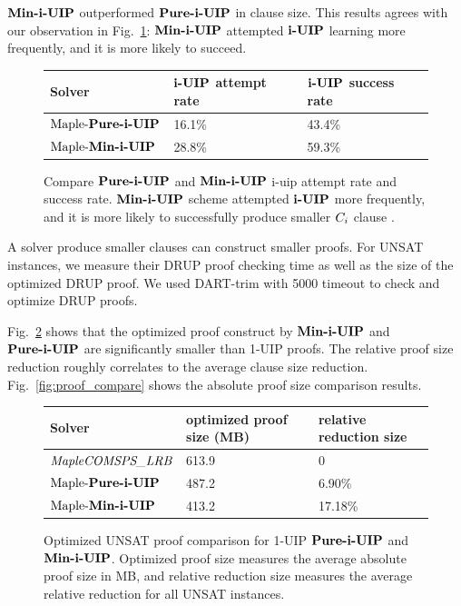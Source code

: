 $\textbf{Min-i-UIP}$ outperformed $\textbf{Pure-i-UIP}$ in clause size.  This results agrees with our observation in Fig.~\ref{fig:t2}: $\textbf{Min-i-UIP}$ attempted $\textbf{i-UIP}$ learning more frequently, and it is more likely to succeed.  

\begin{figure} 
\begin{center} 
\begin{tabular}{ | m{3.5cm} | m{5cm}| m{3.5cm} | } 
\hline
Solver & $\textbf{i-UIP}$ attempt rate & $\textbf{i-UIP}$ success rate  \\ 
\hline
$\text{Maple-\textbf{Pure-i-UIP}}$ & 16.1\% & 43.4\% \\ 
\hline
$\text{Maple-\textbf{Min-i-UIP}}$ & 28.8\% & 59.3\% \\ 
\hline
\end{tabular}
\end{center}
\caption{Compare $\textbf{Pure-i-UIP}$ and $\textbf{Min-i-UIP}$ i-uip attempt rate and success rate. $\textbf{Min-i-UIP}$ scheme attempted $\textbf{i-UIP}$ more frequently, and it is more likely to successfully produce smaller $C_{i}$ clause .}
\label{fig:t2}
\end{figure}

A solver produce smaller clauses can construct smaller proofs. For UNSAT instances, we measure their DRUP\cite{} proof checking time as well as the size of the optimized DRUP proof. We used DART-trim \cite{} with 5000 timeout to check and optimize DRUP proofs. 

Fig.~\ref{fig:t3} shows that the optimized proof construct by $\textbf{Min-i-UIP}$ and $\textbf{Pure-i-UIP}$ are significantly smaller than 1-UIP proofs. The relative proof size reduction roughly correlates to the average clause size reduction. Fig.~\ref{fig:proof_compare} shows the absolute proof size comparison results. 

\begin{figure} 
\begin{center} 
\begin{tabular}{ | m{3.5cm} | m{5cm}| m{3.5cm} | } 
\hline
Solver & optimized proof size (MB) & relative reduction size  \\ 
\hline
$\textit{MapleCOMSPS\_LRB}$ & 613.9 & 0  \\ 
\hline
$\text{Maple-\textbf{Pure-i-UIP}}$ & 487.2 & 6.90\% \\ 
\hline
$\text{Maple-\textbf{Min-i-UIP}}$ & 413.2 & 17.18\% \\ 
\hline
\end{tabular}
\end{center}
\caption{Optimized UNSAT proof comparison for 1-UIP $\textbf{Pure-i-UIP}$ and $\textbf{Min-i-UIP}$. Optimized proof size measures the average absolute proof size in MB, and relative reduction size measures the average relative reduction for all UNSAT instances.}
\label{fig:t3}
\end{figure}

